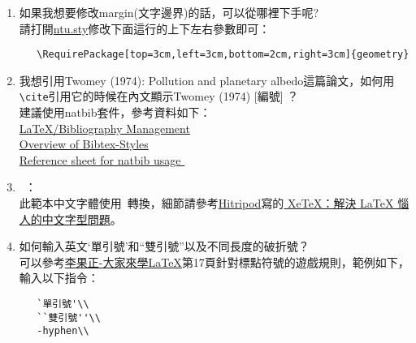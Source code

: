 \begin{acknowledgementsCH}
\begin{enumerate}[leftmargin=0pt, topsep=0pt, itemsep=0pt, label=\Roman{*}.]
\begin{enumerate}[topsep=0pt, itemsep=0pt, label=$\bullet$]
       \begin{verbatim}    
   \begin{figure}[htb]
   ...
   \begin{table}[htb]
       \end{verbatim}
       改成
        \begin{verbatim}    
   \begin{figure}[!]
   ...
   \begin{table}[!]
       \end{verbatim}
       剩下的只要注意章節圖表的計數器設定即可。\texttt{\textbackslash ref}和\texttt{\textbackslash label}指令可以在此圖表章節與正文章節使用。
        \item 如果我想要修改margin(文字邊界)的話，可以從哪裡下手呢?\\
        請打開\href{run:./ntu.sty}{ntu.sty}修改下面這行的上下左右參數即可：
       \begin{verbatim}
   \RequirePackage[top=3cm,left=3cm,bottom=2cm,right=3cm]{geometry}
       \end{verbatim}
       \item 我想引用Twomey (1974): Pollution and planetary albedo這篇論文，如何用\texttt{\textbackslash cite}引用它的時候在內文顯示Twomey (1974) [編號] ？\\
       建議使用natbib套件，參考資料如下：\\
       \href{http://en.wikibooks.org/wiki/LaTeX/Bibliography_Management}{LaTeX/Bibliography Management}\\
       \href{http://nodonn.tipido.net/bibstyle.php}{Overview of Bibtex-Styles}\\
       \href{http://merkel.zoneo.net/Latex/natbib.php}{Reference sheet for natbib usage }\
    \item \XeTeX\ ：\\
       此範本中文字體使用\XeTeX\ 轉換，細節請參考\href{http://www.hitripod.com/blog/}{Hitripod}寫的\href{http://www.hitripod.com/blog/2011/04/xetex-chinese-font-cjk-latex/}{ 
   XeTeX：解決 LaTeX 惱人的中文字型問題}。
    \item 如何輸入英文`單引號'和``雙引號''以及不同長度的破折號？\\
           可以參考\href{run:./latex123.pdf}{李果正-大家來學\LaTeX}第17頁針對標點符號的遊戲規則，範例如下，輸入以下指令：\\
           \begin{verbatim}
   `單引號'\\
   ``雙引號''\\
   -hyphen\\

\end{verbatim}
\end{enumerate}
\end{enumerate}
\end{acknowledgementsCH}

